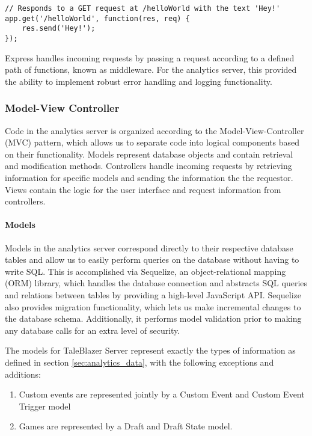 \medskip
\begin{lstlisting}[caption=Example of Express' URL routing]
// Responds to a GET request at /helloWorld with the text 'Hey!'
app.get('/helloWorld', function(res, req) {
	res.send('Hey!');
});
\end{lstlisting}

Express handles incoming requests by passing a request according to a defined path of functions, known as middleware. For the analytics server, this provided the ability to implement robust error handling and logging functionality. 

\subsubsection{Model-View Controller}

Code in the analytics server is organized according to the Model-View-Controller (MVC) pattern, which allows us to separate code into logical components based on their functionality. Models represent database objects and contain retrieval and modification methods. Controllers handle incoming requests by retrieving information for specific models and sending the information the the requestor. Views contain the logic for the user interface and request information from controllers. 

\paragraph{Models} 
Models in the analytics server correspond directly to their respective database tables and allow us to easily perform queries on the database without having to write SQL. This is accomplished via Sequelize, an object-relational mapping (ORM) library, which handles the database connection and abstracts SQL queries and relations between tables by providing a high-level JavaScript API. Sequelize also provides migration functionality, which lets us make incremental changes to the database schema. Additionally, it performs model validation prior to making any database calls for an extra level of security.

The models for TaleBlazer Server represent exactly the types of information as defined in section \ref{sec:analytics_data}, with the following exceptions and additions:

	\begin{enumerate}
		\item Custom events are represented jointly by a Custom Event and Custom Event Trigger model
		\item Games are represented by a Draft and Draft State model.
	\end{enumerate}


